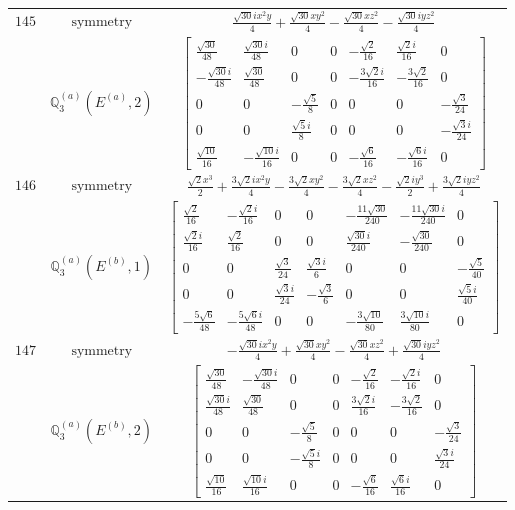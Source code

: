 \documentclass[fleqn,8pt,landscape]{jsarticle}
\begin{document}
\begin{longtable}{ccc}
$ 145 $ & $ \text{symmetry} $ & $ \frac{\sqrt{30} i x^{2} y}{4} + \frac{\sqrt{30} x y^{2}}{4} - \frac{\sqrt{30} x z^{2}}{4} - \frac{\sqrt{30} i y z^{2}}{4} $ \\
$  $ & $ \mathbb{Q}_{3}^{(a)}(E^{(a)},2) $ & $ \begin{bmatrix} \frac{\sqrt{30}}{48} & \frac{\sqrt{30} i}{48} & 0 & 0 & - \frac{\sqrt{2}}{16} & \frac{\sqrt{2} i}{16} & 0 \\ - \frac{\sqrt{30} i}{48} & \frac{\sqrt{30}}{48} & 0 & 0 & - \frac{3 \sqrt{2} i}{16} & - \frac{3 \sqrt{2}}{16} & 0 \\ 0 & 0 & - \frac{\sqrt{5}}{8} & 0 & 0 & 0 & - \frac{\sqrt{3}}{24} \\ 0 & 0 & \frac{\sqrt{5} i}{8} & 0 & 0 & 0 & - \frac{\sqrt{3} i}{24} \\ \frac{\sqrt{10}}{16} & - \frac{\sqrt{10} i}{16} & 0 & 0 & - \frac{\sqrt{6}}{16} & - \frac{\sqrt{6} i}{16} & 0 \end{bmatrix} $ \\ \hline
$ 146 $ & $ \text{symmetry} $ & $ \frac{\sqrt{2} x^{3}}{2} + \frac{3 \sqrt{2} i x^{2} y}{4} - \frac{3 \sqrt{2} x y^{2}}{4} - \frac{3 \sqrt{2} x z^{2}}{4} - \frac{\sqrt{2} i y^{3}}{2} + \frac{3 \sqrt{2} i y z^{2}}{4} $ \\
$  $ & $ \mathbb{Q}_{3}^{(a)}(E^{(b)},1) $ & $ \begin{bmatrix} \frac{\sqrt{2}}{16} & - \frac{\sqrt{2} i}{16} & 0 & 0 & - \frac{11 \sqrt{30}}{240} & - \frac{11 \sqrt{30} i}{240} & 0 \\ \frac{\sqrt{2} i}{16} & \frac{\sqrt{2}}{16} & 0 & 0 & \frac{\sqrt{30} i}{240} & - \frac{\sqrt{30}}{240} & 0 \\ 0 & 0 & \frac{\sqrt{3}}{24} & \frac{\sqrt{3} i}{6} & 0 & 0 & - \frac{\sqrt{5}}{40} \\ 0 & 0 & \frac{\sqrt{3} i}{24} & - \frac{\sqrt{3}}{6} & 0 & 0 & \frac{\sqrt{5} i}{40} \\ - \frac{5 \sqrt{6}}{48} & - \frac{5 \sqrt{6} i}{48} & 0 & 0 & - \frac{3 \sqrt{10}}{80} & \frac{3 \sqrt{10} i}{80} & 0 \end{bmatrix} $ \\ \hline
$ 147 $ & $ \text{symmetry} $ & $ - \frac{\sqrt{30} i x^{2} y}{4} + \frac{\sqrt{30} x y^{2}}{4} - \frac{\sqrt{30} x z^{2}}{4} + \frac{\sqrt{30} i y z^{2}}{4} $ \\
$  $ & $ \mathbb{Q}_{3}^{(a)}(E^{(b)},2) $ & $ \begin{bmatrix} \frac{\sqrt{30}}{48} & - \frac{\sqrt{30} i}{48} & 0 & 0 & - \frac{\sqrt{2}}{16} & - \frac{\sqrt{2} i}{16} & 0 \\ \frac{\sqrt{30} i}{48} & \frac{\sqrt{30}}{48} & 0 & 0 & \frac{3 \sqrt{2} i}{16} & - \frac{3 \sqrt{2}}{16} & 0 \\ 0 & 0 & - \frac{\sqrt{5}}{8} & 0 & 0 & 0 & - \frac{\sqrt{3}}{24} \\ 0 & 0 & - \frac{\sqrt{5} i}{8} & 0 & 0 & 0 & \frac{\sqrt{3} i}{24} \\ \frac{\sqrt{10}}{16} & \frac{\sqrt{10} i}{16} & 0 & 0 & - \frac{\sqrt{6}}{16} & \frac{\sqrt{6} i}{16} & 0 \end{bmatrix} $ \\ \hline

\end{longtable}
\end{document}
